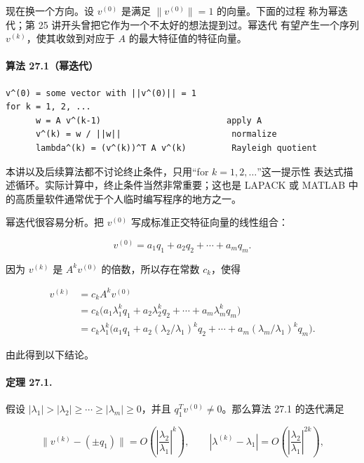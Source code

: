 \documentclass[UTF8,fontset=none,12pt]{ctexart}
\begin{document}
现在换一个方向。设 $v^{(0)}$ 是满足 $\|v^{(0)}\|=1$ 的向量。下面的过程
称为幂迭代；第 25 讲开头曾把它作为一个不太好的想法提到过。幂迭代
有望产生一个序列 $v^{(k)}$，使其收敛到对应于 $A$ 的最大特征值的特征向量。

\paragraph{算法 27.1（幂迭代）}
\begin{verbatim}
v^(0) = some vector with ||v^(0)|| = 1
for k = 1, 2, ...
      w = A v^(k-1)                         apply A
      v^(k) = w / ||w||                      normalize
      lambda^(k) = (v^(k))^T A v^(k)         Rayleigh quotient
\end{verbatim}

本讲以及后续算法都不讨论终止条件，只用“for $k=1,2,\ldots$”这一提示性
表达式描述循环。实际计算中，终止条件当然非常重要；这也是 LAPACK 或
MATLAB 中的高质量软件通常优于个人临时编写程序的地方之一。

幂迭代很容易分析。把 $v^{(0)}$ 写成标准正交特征向量的线性组合：

\[
v^{(0)}=a_1q_1+a_2q_2+\cdots+a_mq_m.
\]

因为 $v^{(k)}$ 是 $A^kv^{(0)}$ 的倍数，所以存在常数 $c_k$，使得

\begin{equation}
\begin{aligned}
v^{(k)}
 &=c_kA^kv^{(0)}\\
 &=c_k\bigl(a_1\lambda_1^kq_1+a_2\lambda_2^kq_2+\cdots+a_m\lambda_m^kq_m\bigr)\\
 &=c_k\lambda_1^k\bigl(a_1q_1+a_2(\lambda_2/\lambda_1)^kq_2
 +\cdots+a_m(\lambda_m/\lambda_1)^kq_m\bigr).
\end{aligned}
\tag{27.4}
\end{equation}

由此得到以下结论。

\paragraph{定理 27.1.}
假设
$|\lambda_1|>|\lambda_2|\ge\cdots\ge|\lambda_m|\ge0$，并且
$q_1^Tv^{(0)}\ne0$。那么算法 27.1 的迭代满足

\begin{equation}
\|v^{(k)}-(\pm q_1)\|
 =O\left(\left|\frac{\lambda_2}{\lambda_1}\right|^k\right),
\qquad
|\lambda^{(k)}-\lambda_1|
 =O\left(\left|\frac{\lambda_2}{\lambda_1}\right|^{2k}\right),
\tag{27.5}
\end{equation}
\end{document}
